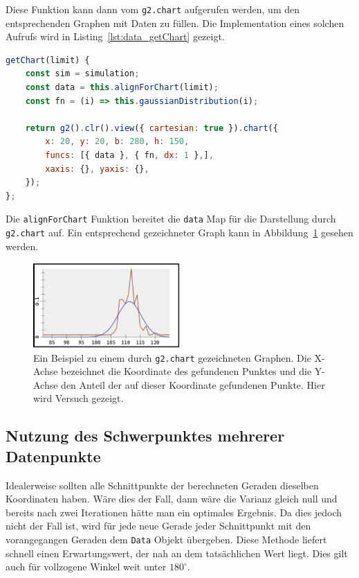 Diese Funktion kann dann vom \lstinline{g2.chart} aufgerufen werden, um den entsprechenden Graphen mit Daten zu füllen.
Die Implementation eines solchen Aufrufs wird in Listing~\ref{lst:data_getChart} gezeigt.

\begin{lstlisting}[language=JavaScript, caption={Definition der \lstinline{getChart} Funktion der \lstinline{Data} Klasse.}, label={lst:data_getChart}]
getChart(limit) {
    const sim = simulation;
    const data = this.alignForChart(limit);
    const fn = (i) => this.gaussianDistribution(i);

    return g2().clr().view({ cartesian: true }).chart({
        x: 20, y: 20, b: 280, h: 150,
        funcs: [{ data }, { fn, dx: 1 },],
        xaxis: {}, yaxis: {},
    });
};
\end{lstlisting}

Die \lstinline{alignForChart} Funktion bereitet die \lstinline{data} Map für die Darstellung durch \lstinline{g2.chart} auf.
Ein entsprechend gezeichneter Graph kann in Abbildung~\ref{fig:normalverteilung} gesehen werden.

\begin{figure}
    \centering
    \includegraphics[width=0.5\textwidth]{gfx/normalverteilung.png}
    \caption[Beispiel für in etwa normal verteilte Daten.]{Ein Beispiel zu einem durch \lstinline{g2.chart} gezeichneten Graphen. Die X-Achse bezeichnet die Koordinate des gefundenen Punktes und die Y-Achse den Anteil der auf dieser Koordinate gefundenen Punkte. Hier wird Versuch  gezeigt.}
    \label{fig:normalverteilung}
\end{figure}

\subsection{Nutzung des Schwerpunktes mehrerer Datenpunkte}\label{ch:nutzung_des_schwerpunktes}

Idealerweise sollten alle Schnittpunkte der berechneten Geraden dieselben Koordinaten haben.
Wäre dies der Fall, dann wäre die Varianz gleich null und bereits nach zwei Iterationen hätte man ein optimales Ergebnis.
Da dies jedoch nicht der Fall ist, wird für jede neue Gerade jeder Schnittpunkt mit den vorangegangen Geraden dem \lstinline{Data} Objekt übergeben.
Diese Methode liefert schnell einen Erwartungswert, der nah an dem tatsächlichen Wert liegt.
Dies gilt auch für vollzogene Winkel weit unter $180^\circ$.

